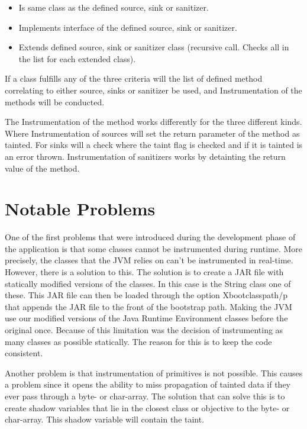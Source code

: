 \hfill
\begin{itemize}
    \item Is same class as the defined source, sink or sanitizer.
    \item Implements interface of the defined source, sink or sanitizer.
    \item Extends defined source, sink or sanitizer class (recursive call. Checks all in the list for each extended class). 
\end{itemize}
\hfill

If a class fulfills any of the three criteria will the list of defined method correlating to either source, sinks or sanitizer be used, and Instrumentation of the methods will be conducted.

The Instrumentation of the method works differently for the three different kinds. Where Instrumentation of sources will set the return parameter of the method as tainted. For sinks will a check where the taint flag is checked and if it is tainted is an error thrown. Instrumentation of sanitizers works by detainting the return value of the method.



\section{Notable Problems}
\label{NotableProblems}
One of the first problems that were introduced during the development phase of the application is that some classes cannot be instrumented during runtime. More precisely, the classes that the JVM relies on can't be instrumented in real-time. However, there is a solution to this. The solution is to create a JAR file with statically modified versions of the classes. In this case is the String class one of these. This JAR file can then be loaded through the option Xbootclasspath/p that appends the JAR file to the front of the bootstrap path. Making the JVM use our modified versions of the Java Runtime Environment classes \parencite{xboot} before the original once. Because of this limitation was the decision of instrumenting as many classes as possible statically. The reason for this is to keep the code consistent.

Another problem is that instrumentation of primitives is not possible. This causes a problem since it opens the ability to miss propagation of tainted data if they ever pass through a byte- or char-array. The solution that can solve this is to create shadow variables that lie in the closest class or objective to the byte- or char-array. This shadow variable will contain the taint.

